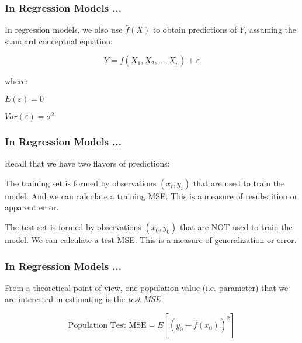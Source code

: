\documentclass[12pt]{beamer}\usepackage[]{graphicx}\usepackage[]{color}
\begin{document}

\begin{frame}
\begin{center}
\Huge{}
\end{center}
\end{frame}


\begin{frame}
\frametitle{In Regression Models ...}

In regression models, we also use $\hat{f}(X)$ to obtain predictions of $Y$,
assuming the standard conceptual equation: 

$$
Y = f(X_1, X_2, \dots, X_p) + \varepsilon
$$

where:
\bi
  \item $E(\varepsilon) = 0$
  \item $Var(\varepsilon) = \sigma^2$
\ei

\end{frame}


\begin{frame}
\frametitle{In Regression Models ...}

Recall that we have two flavors of predictions:

\bigskip
The training set is formed by observations $(x_i, y_i)$ that are used to train
the model. And we can calculate a training MSE. This is a measure of resubstition 
or apparent error.

\bigskip
The test set is formed by observations $(x_0, y_0)$ that are NOT used to train
the model. We can calculate a test MSE. This is a measure of generalization 
or error.

\end{frame}


\begin{frame}
\frametitle{In Regression Models ...}

From a theoretical point of view, one population value (i.e. parameter) 
that we are interested in estimating is the \textit{test MSE}

$$
\text{Population Test MSE} = E [(y_0 - \hat{f}(x_0))^2]
$$



\end{frame}
\end{document}

